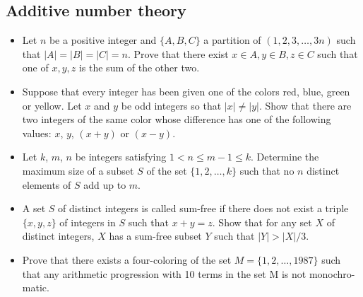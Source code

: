 \subsection{Additive number theory}
\begin{itemize}
    \item Let $n$ be a positive integer and $\{A, B, C\}$ a partition of $(1, 2,
        3, \ldots, 3n)$ such that $|A| = |B| = |C| = n$. 
        Prove that there exist $x \in A, y \in B, z \in C$ such that one of $x,
        y, z$ is the sum of the other two. 
    \item Suppose that every integer has been given one of the colors 
    red, blue, green or yellow. Let $x$ and $y$ be odd integers so that 
    $|x| \ne |y|$. Show that there are two integers of the same color whose difference
    has one of the following values: $x$, $y$, $(x+y)$ or 
    $(x-y)$.  

    \item Let $k$, $m$, $n$ be integers satisfying $1 < n \le m-1 \le k$. Determine 
    the maximum size of a subset $S$ of the set $\{1, 2, \ldots, k\}$ such that 
    no $n$ distinct elements of $S$ add up to $m$.

    \item A set $S$ of distinct integers is called sum-free if there does not 
    exist a triple $\{x, y, z\}$ of integers in $S$ such that $x + y = z$. Show 
    that for any set $X$ of distinct integers, $X$ has a sum-free subset 
    $Y$ such that $|Y| > |X|/3$.

    \item Prove that there exists a four-coloring of the set $M = \{1,2,\ldots,1987\}$
    such that any arithmetic progression with 10 terms in the set M is not monochro-
    matic.
\end{itemize}

